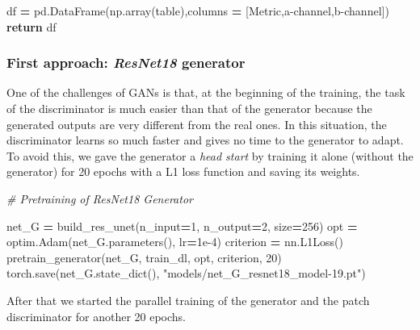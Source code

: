 \documentclass[
]{article}
\newenvironment{Shaded}{\begin{snugshade}}{\end{snugshade}}
\newcommand{\CommentTok}[1]{\textcolor[rgb]{0.56,0.35,0.01}{\textit{#1}}}
\newcommand{\ControlFlowTok}[1]{\textcolor[rgb]{0.13,0.29,0.53}{\textbf{#1}}}
\newcommand{\DecValTok}[1]{\textcolor[rgb]{0.00,0.00,0.81}{#1}}
\newcommand{\FloatTok}[1]{\textcolor[rgb]{0.00,0.00,0.81}{#1}}
\newcommand{\NormalTok}[1]{#1}
\newcommand{\OperatorTok}[1]{\textcolor[rgb]{0.81,0.36,0.00}{\textbf{#1}}}
\newcommand{\StringTok}[1]{\textcolor[rgb]{0.31,0.60,0.02}{#1}}
\begin{document}
\begin{Shaded}
\begin{Highlighting}[]
\NormalTok{    df }\OperatorTok{=}\NormalTok{ pd.DataFrame(np.array(table),columns }\OperatorTok{=}\NormalTok{ [}\StringTok{\textquotesingle{}Metric\textquotesingle{}}\NormalTok{,}\StringTok{\textquotesingle{}a{-}channel\textquotesingle{}}\NormalTok{,}\StringTok{\textquotesingle{}b{-}channel\textquotesingle{}}\NormalTok{])}
    \ControlFlowTok{return}\NormalTok{ df}
\end{Highlighting}
\end{Shaded}

\hypertarget{first-approach-resnet18-generator}{%
\subsubsection{\texorpdfstring{First approach: \emph{ResNet18}
generator}{First approach: ResNet18 generator}}\label{first-approach-resnet18-generator}}

One of the challenges of GANs is that, at the beginning of the training,
the task of the discriminator is much easier than that of the generator
because the generated outputs are very different from the real ones. In
this situation, the discriminator learns so much faster and gives no
time to the generator to adapt. To avoid this, we gave the generator a
\emph{head start} by training it alone (without the generator) for 20
epochs with a L1 loss function and saving its weights.

\begin{Shaded}
\begin{Highlighting}[]
\CommentTok{\# Pretraining of ResNet18 Generator}

\NormalTok{net\_G }\OperatorTok{=}\NormalTok{ build\_res\_unet(n\_input}\OperatorTok{=}\DecValTok{1}\NormalTok{, n\_output}\OperatorTok{=}\DecValTok{2}\NormalTok{, size}\OperatorTok{=}\DecValTok{256}\NormalTok{)}
\NormalTok{opt }\OperatorTok{=}\NormalTok{ optim.Adam(net\_G.parameters(), lr}\OperatorTok{=}\FloatTok{1e{-}4}\NormalTok{)}
\NormalTok{criterion }\OperatorTok{=}\NormalTok{ nn.L1Loss()        }
\NormalTok{pretrain\_generator(net\_G, train\_dl, opt, criterion, }\DecValTok{20}\NormalTok{)}
\NormalTok{torch.save(net\_G.state\_dict(), }\StringTok{"models/net\_G\_resnet18\_model{-}19.pt"}\NormalTok{)}
\end{Highlighting}
\end{Shaded}

After that we started the parallel training of the generator and the
patch discriminator for another 20 epochs.
\end{document}
